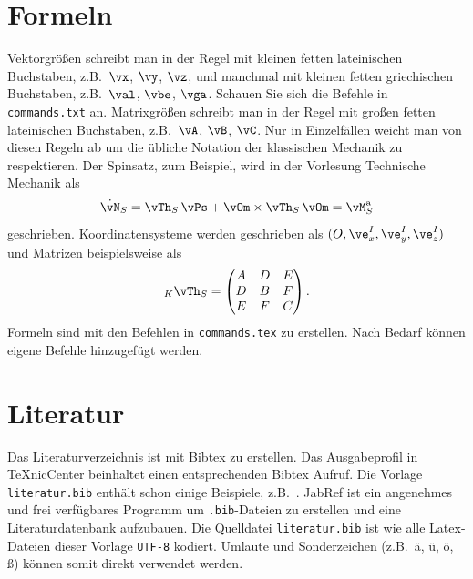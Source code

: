 \section{Formeln}
Vektorgrößen schreibt man in der Regel mit kleinen fetten lateinischen Buchstaben, z.B.\ $\vx$, $\vy$, $\vz$, und manchmal mit kleinen fetten griechischen Buchstaben, z.B.\ $\val$, $\vbe$, $\vga$. Schauen Sie sich die Befehle in \verb"commands.txt" an. Matrixgrößen schreibt man in der Regel mit großen fetten lateinischen Buchstaben, z.B.\ $\vA$, $\vB$, $\vC$. Nur in Einzelfällen weicht man von diesen Regeln ab um die übliche Notation der klassischen Mechanik zu respektieren. Der Spinsatz, zum Beispiel, wird in der Vorlesung Technische Mechanik als
\begin{equation}\label{spinsatz}
 \dot{\vN}_S = \vTh_S\,\vPs + \vOm\times\vTh_S\,\vOm =
 \vM_S^\mathrm{a}
\end{equation}
geschrieben. Koordinatensysteme werden geschrieben als $(O, \ve_x^I, \ve_y^I, \ve_z^I)$ und Matrizen beispielsweise als
\begin{equation}
 _K\vTh_S = \begin{pmatrix}
              A & D & E\\
              D & B & F\\
              E & F & C
            \end{pmatrix}.
\end{equation}
Formeln sind mit den Befehlen in \verb"commands.tex" zu erstellen. Nach Bedarf können eigene Befehle hinzugefügt werden.
\newpage
\section{Literatur}
Das Literaturverzeichnis ist mit Bibtex zu erstellen. Das Ausgabeprofil in TeXnicCenter beinhaltet einen entsprechenden Bibtex Aufruf. Die Vorlage \verb"literatur.bib" enthält schon einige Beispiele, z.B.\ \cite{Lein2002,Lein2003,Lein2004,Lein2005,Lein2006,Lein2007}. JabRef ist ein angenehmes und frei verfügbares Programm um \verb".bib"-Dateien zu erstellen und eine Literaturdatenbank aufzubauen. Die Quelldatei \verb"literatur.bib" ist wie alle Latex-Dateien dieser Vorlage \verb"UTF-8" kodiert. Umlaute und Sonderzeichen (z.B.\ ä, ü, ö, ß) können somit direkt verwendet werden.
